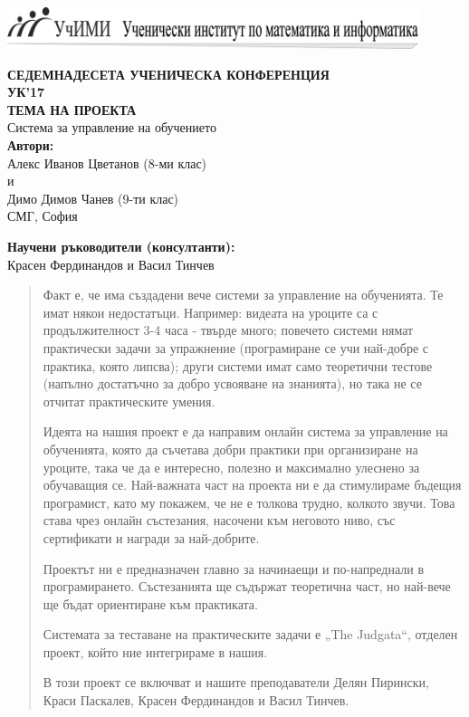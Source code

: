 \documentclass[12pt]{article}
\begin{document}
	\includegraphics[width=0.9\textwidth]{logo.png} \\
	\begin{center}
		\textbf{СЕДЕМНАДЕСЕТА УЧЕНИЧЕСКА КОНФЕРЕНЦИЯ \\ УК’17} \\ \vspace{3cm}
		\textbf{ТЕМА НА ПРОЕКТА}\\
		\large{Система за управление на обучението}\\ \vspace{3cm}
		\textbf{Автори:}\\
		Алекс Иванов Цветанов (8-ми клас) \\ и \\ Димо Димов Чанев (9-ти клас)\\
		СМГ, София\\ \vspace{3cm}
		
		\textbf{Научени ръководители (консултанти):} \\
		Красен Фердинандов и Васил Тинчев
	\end{center}
	
	\newpage
	\tableofcontents
	\newpage
	\begin{abstract}
		\large{
			Факт е, че има създадени вече системи за управление на обученията. Те имат някои недостатъци. Например: видеата на уроците са с продължителност 3-4 часа - твърде много; повечето системи нямат практически задачи за упражнение (програмиране се учи най-добре с практика, която липсва); други системи имат само теоретични тестове (напълно достатъчно за добро усвояване на знанията), но така не се отчитат практическите умения.
			
			Идеята на нашия проект е да направим онлайн система за управление на обученията, която да съчетава добри практики при организиране на уроците, така че да е интересно, полезно и максимално улеснено за обучаващия се. Най-важната част на проекта ни е да стимулираме бъдещия програмист, като му покажем, че не е толкова трудно, колкото звучи. Това става чрез онлайн състезания, насочени към неговото ниво, със сертификати и награди за най-добрите.
			
			Проектът ни е предназначен главно за начинаещи и по-напреднали в програмирането. Състезанията ще съдържат теоретична част, но най-вече ще бъдат ориентиране към практиката.
			
			Системата за теставане на практическите задачи е „\foreignlanguage{english}{The Judgata}“, отделен проект, който ние интегрираме в нашия.
			
			В този проект се включват и нашите преподаватели Делян Пирински, Краси Паскалев, Красен Фердинандов и Васил Тинчев.
		}
	\end{abstract}
	\newpage
\end{document}
